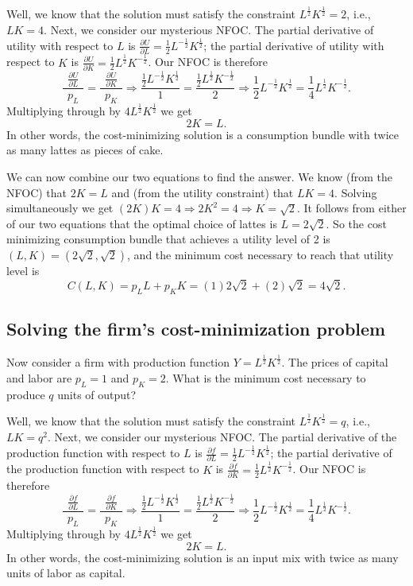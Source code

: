 Well, we know that the solution must satisfy the constraint $L^{\frac{1}{2}}K^{\frac{1}{2}}=2$, i.e., $LK=4$. Next, we consider our mysterious NFOC. The partial derivative of utility with respect to $L$ is $\displaystyle \frac{\partial U}{\partial L}=\frac{1}{2}L^{-\frac{1}{2}}K^{\frac{1}{2}}$; the partial derivative of utility with respect to $K$ is $\displaystyle \frac{\partial U}{\partial K}=\frac{1}{2}L^{\frac{1}{2}}K^{-\frac{1}{2}}$. Our NFOC is therefore
\[
\frac{\ \ \frac{\partial U}{\partial L}\ \ }{p_L}=\frac{\ \
\frac{\partial U}{\partial K}\ \ }{p_K} \Longrightarrow
\frac{\frac{1}{2}L^{-\frac{1}{2}}K^{\frac{1}{2}}}{1}=\frac{\frac{1}{2}L^{\frac{1}{2}}K^{-\frac{1}{2}}}{2}
\Longrightarrow  \frac{1}{2}L^{-\frac{1}{2}}K^{\frac{1}{2}} =
\frac{1}{4}L^{\frac{1}{2}}K^{-\frac{1}{2}}.
\]
Multiplying through by $4L^{\frac{1}{2}}K^{\frac{1}{2}}$ we get
\[
2K=L.
\]
In other words, the cost-minimizing solution is a consumption bundle with twice as many lattes as pieces of cake.

We can now combine our two equations to find the answer. We know (from the NFOC) that $2K=L$ and (from the utility constraint) that $LK=4$. Solving simultaneously we get $(2K)K=4\Longrightarrow 2K^2=4\Longrightarrow K=\sqrt{2}$. It follows from either of our two equations that the optimal choice of lattes is $L=2\sqrt{2}$. So the cost minimizing consumption bundle that achieves a utility level of 2 is $(L, K)=(2\sqrt{2}, \sqrt{2})$, and the minimum cost necessary to reach that utility level is
\[
C(L, K) = p_L L + p_K K = (1)2\sqrt{2}+(2)\sqrt{2}=4\sqrt{2}.
\]

\subsection*{Solving the firm's cost-minimization problem}

Now consider a firm with production function $Y=L^{\frac{1}{2}}K^{\frac{1}{2}}$. The prices of capital and labor are $p_L=1$ and $p_K=2$. What is the minimum cost necessary to produce $q$ units of output?

Well, we know that the solution must satisfy the constraint $L^{\frac{1}{2}}K^{\frac{1}{2}}=q$, i.e., $LK=q^2$. Next, we consider our mysterious NFOC. The partial derivative of the production function with respect to $L$ is $\displaystyle \frac{\partial f}{\partial L}=\frac{1}{2}L^{-\frac{1}{2}}K^{\frac{1}{2}}$; the partial derivative of the production function with respect to $K$ is $\displaystyle \frac{\partial f}{\partial K}=\frac{1}{2}L^{\frac{1}{2}}K^{-\frac{1}{2}}$. Our NFOC is therefore
\[
\frac{\ \ \frac{\partial f}{\partial L}\ \ }{p_L}=\frac{\ \
\frac{\partial f}{\partial K}\ \ }{p_K} \Longrightarrow
\frac{\frac{1}{2}L^{-\frac{1}{2}}K^{\frac{1}{2}}}{1}=\frac{\frac{1}{2}L^{\frac{1}{2}}K^{-\frac{1}{2}}}{2}
\Longrightarrow  \frac{1}{2}L^{-\frac{1}{2}}K^{\frac{1}{2}} =
\frac{1}{4}L^{\frac{1}{2}}K^{-\frac{1}{2}}.
\]
Multiplying through by $4L^{\frac{1}{2}}K^{\frac{1}{2}}$ we get
\[
2K=L.
\]
In other words, the cost-minimizing solution is an input mix with twice as many units of labor as capital.

